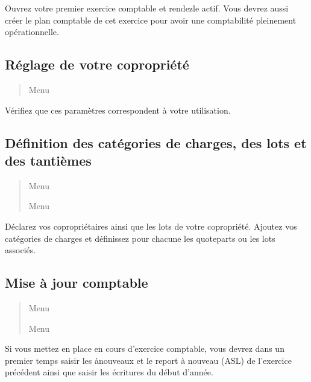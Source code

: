 \documentclass[a4paper,10pt,oneside,french]{sphinxmanual}
\begin{document}
\sphinxAtStartPar
Ouvrez votre premier exercice comptable et rendez\sphinxhyphen{}le actif.
Vous devrez aussi créer le plan comptable de cet exercice pour avoir une comptabilité pleinement opérationnelle.


\subsection{Réglage de votre copropriété}
\label{\detokenize{syndic/first_step:reglage-de-votre-copropriete}}\begin{quote}

\sphinxAtStartPar
Menu 
\end{quote}

\sphinxAtStartPar
Vérifiez que ces paramètres correspondent à votre utilisation.


\subsection{Définition des catégories de charges, des lots et des tantièmes}
\label{\detokenize{syndic/first_step:definition-des-categories-de-charges-des-lots-et-des-tantiemes}}\begin{quote}

\sphinxAtStartPar
Menu 

\sphinxAtStartPar
Menu 
\end{quote}

\sphinxAtStartPar
Déclarez vos copropriétaires ainsi que les lots de votre copropriété.
Ajoutez vos catégories de charges et définissez pour chacune les quote\sphinxhyphen{}parts ou les lots associés.


\subsection{Mise à jour comptable}
\label{\detokenize{syndic/first_step:mise-a-jour-comptable}}\begin{quote}

\sphinxAtStartPar
Menu 

\sphinxAtStartPar
Menu 
\end{quote}

\sphinxAtStartPar
Si vous mettez en place  en cours d’exercice comptable, vous devrez dans un premier temps saisir les à\sphinxhyphen{}nouveaux et le report à nouveau (ASL) de l’exercice précédent ainsi que saisir les écritures du début d’année.
\end{document}
